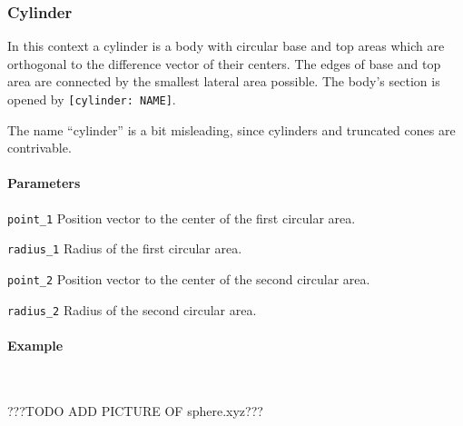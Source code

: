 \subsubsection{Cylinder}
In this context a cylinder is a body with circular base and top areas which are orthogonal to the difference vector of their centers. The edges of base and top area are connected by the smallest lateral area possible. The body's section is opened by \lstinline{[cylinder: NAME]}.

The name ``cylinder'' is a bit misleading, since cylinders and truncated cones are contrivable.

\paragraph{Parameters}
\begin{description}
 \item{\lstinline{point_1}} Position vector to the center of the first circular area.
 \item{\lstinline{radius_1}} Radius of the first circular area.
 \item{\lstinline{point_2}} Position vector to the center of the second circular area.
 \item{\lstinline{radius_2}} Radius of the second circular area.
\end{description}

\paragraph{Example}\ 


???TODO ADD PICTURE OF sphere.xyz???